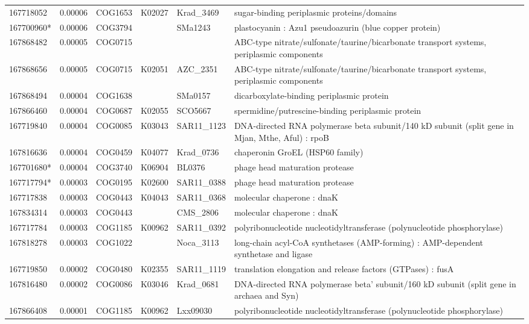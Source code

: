 \begin{landscape}
\begin{longtable}{p{1.6cm}p{1.2cm}p{1.5cm}p{1.5cm}p{2.8cm}p{13.5cm}}
167718052&0.00006&COG1653&K02027&Krad\_3469&sugar-binding periplasmic proteins/domains \\
167700960*&0.00006&COG3794&&SMa1243&plastocyanin :  Azu1 pseudoazurin (blue copper protein) \\
167868482&0.00005&COG0715&&&ABC-type nitrate/sulfonate/taurine/bicarbonate transport systems, periplasmic components \\
167868656&0.00005&COG0715&K02051&AZC\_2351&ABC-type nitrate/sulfonate/taurine/bicarbonate transport systems, periplasmic components \\
167868494&0.00004&COG1638&&SMa0157&dicarboxylate-binding periplasmic protein \\
167866460&0.00004&COG0687&K02055&SCO5667&spermidine/putrescine-binding periplasmic protein \\
167719840&0.00004&COG0085&K03043&SAR11\_1123&DNA-directed RNA polymerase beta subunit/140 kD subunit (split gene in Mjan, Mthe, Aful) : rpoB \\
167816636&0.00004&COG0459&K04077&Krad\_0736&chaperonin GroEL (HSP60 family) \\
167701680*&0.00004&COG3740&K06904&BL0376&phage head maturation protease \\
167717794*&0.00003&COG0195&K02600&SAR11\_0388&phage head maturation protease \\
167717838&0.00003&COG0443&K04043&SAR11\_0368&molecular chaperone : dnaK \\
167834314&0.00003&COG0443&&CMS\_2806&molecular chaperone : dnaK \\
167717784&0.00003&COG1185&K00962&SAR11\_0392&polyribonucleotide nucleotidyltransferase (polynucleotide phosphorylase) \\
167818278&0.00003&COG1022&&Noca\_3113&long-chain acyl-CoA synthetases (AMP-forming) : AMP-dependent synthetase and ligase \\
167719850&0.00002&COG0480&K02355&SAR11\_1119&translation elongation and release factors (GTPases) : fusA \\
167816480&0.00002&COG0086&K03046&Krad\_0681&DNA-directed RNA polymerase beta' subunit/160 kD subunit (split gene in archaea and Syn) \\
167866408&0.00001&COG1185&K00962&Lxx09030&polyribonucleotide nucleotidyltransferase (polynucleotide phosphorylase) \\
\end{longtable}
\endgroup
\end{landscape}
